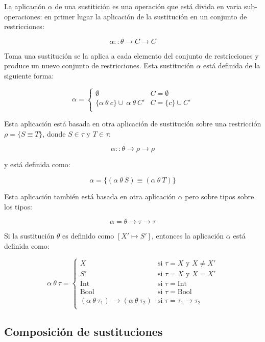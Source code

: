 \documentclass{article}
\begin{document}
La aplicación $\alpha$ de una sustitición es una operación
que está divida en varia sub-operaciones: en primer lugar
la aplicación de la sustitución en un conjunto de restricciones:

\[
  \alpha :: \theta \to C \to C
\]

Toma una sustitución se la aplica a cada elemento del conjunto de
restricciones y produce un nuevo conjunto de restricciones. Esta
sustitución $\alpha$ está definida de la siguiente forma:

\[
  \alpha =
  \begin{cases}
    \emptyset & C = \emptyset \\
    \{\alpha\  \theta\  c\} \cup\ \alpha\ \theta\ C' & C = \{c\} \cup C' \\
  \end{cases}
\]

Esta aplicación está basada en otra aplicación de sustitución sobre
una restricción $\rho = \{ S \equiv T \}$, donde $S \in \tau$ y $T \in
\tau$:

\[
  \alpha :: \theta \to \rho \to \rho
\]

y está definida como:

\[
  \alpha = \{(\alpha\ \theta\ S) \equiv (\alpha\ \theta\ T)\}
\]

Esta aplicación también está basada en otra aplicación $\alpha$ pero
sobre tipos sobre los tipos:

\[
  \alpha = \theta \to \tau \to \tau
\]

Si la sustitución $\theta$ es definido como $[ X' \mapsto S']$,
entonces la aplicación $\alpha$ está definida como:

\[
  \alpha\ \theta\ \tau =
  \begin{cases}
    X & \text{si $\tau = X$ y $X \neq X'$} \\
    S' & \text{si $\tau = X$ y $X = X'$} \\
    \text{Int} & \text{si $\tau = \text{Int}$} \\
    \text{Bool} & \text{si $\tau = \text{Bool}$} \\
    (\alpha\ \theta\ \tau_1)\ \to (\alpha\ \theta\  \tau_2) & \text{si $\tau = \tau_1 \to \tau_2$} \\
  \end{cases}
\]

\subsection{Composición de sustituciones}
\label{sec:compsus}
\end{document}
